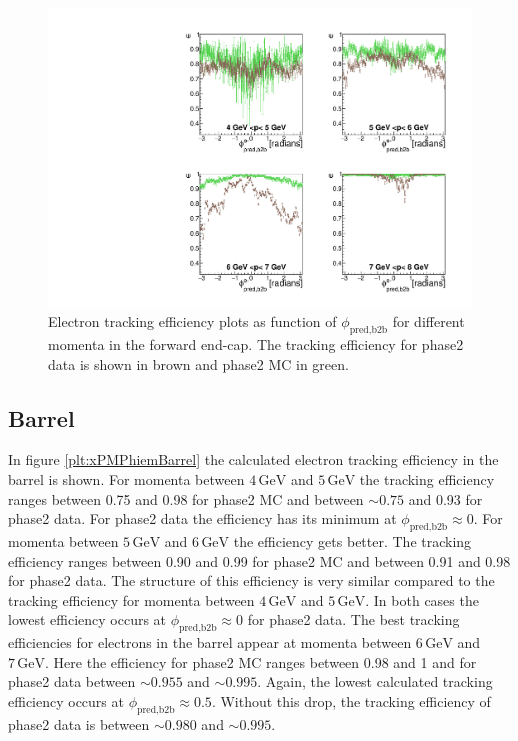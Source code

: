 \documentclass[a4paper,11pt,twosided,final,german,openbib,pdftex,listof=totoc,bibliography=totoc]{scrbook}
\begin{document}
\begin{figure}[!htbp]
	\centering
	\includegraphics[width=\textwidth]{Plots/master/xPMPhiemFC}
	\caption[Momentum $\phi_{\textrm{pred,b2b}}$ Electron Forward End-Cap Efficiency Phase2]{Electron tracking efficiency plots as function of $\phi_{\textrm{pred,b2b}}$ for different momenta in the forward end-cap. The tracking efficiency for phase2 data is shown in brown and phase2 MC in green.}
		\label{plt:xPMPhiemFC}
\end{figure}

\newpage

\subsection{Barrel}

In figure \ref{plt:xPMPhiemBarrel} the calculated electron tracking efficiency in the barrel is shown. For momenta between $4\,\textrm{GeV}$ and $5\,\textrm{GeV}$ the tracking efficiency ranges between 0.75 and 0.98 for phase2 MC and between $\sim 0.75$ and 0.93 for phase2 data. For phase2 data the efficiency has its minimum at $\phi_{\textrm{pred,b2b}} \approx 0$. For momenta between $5\,\textrm{GeV}$ and $6\,\textrm{GeV}$ the efficiency gets better. The tracking efficiency ranges between 0.90 and 0.99 for phase2 MC and between 0.91 and 0.98 for phase2 data. The structure of this efficiency is very similar compared to the tracking efficiency for momenta between $4\,\textrm{GeV}$ and $5\,\textrm{GeV}$. In both cases the lowest efficiency occurs at $\phi_{\textrm{pred,b2b}} \approx 0$ for phase2 data. The best tracking efficiencies for electrons in the barrel appear at momenta between $6\,\textrm{GeV}$ and $7\,\textrm{GeV}$. Here the efficiency for phase2 MC ranges between 0.98 and 1 and for phase2 data between $\sim 0.955$ and $\sim 0.995$. Again, the lowest calculated tracking efficiency occurs at  $\phi_{\textrm{pred,b2b}} \approx 0.5$. Without this drop, the tracking efficiency of phase2 data is between $\sim 0.980$ and $\sim 0.995$. 
\end{document}
